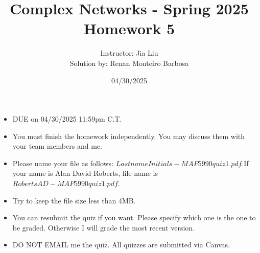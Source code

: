 \documentclass{amsart}
\theoremstyle{definition}
\theoremstyle{remark}
\numberwithin{equation}{section}
\begin{document}
\title{Complex Networks  - Spring 2025\\{\bf Homework 5}}%
\author{Instructor: Jia Liu \\ Solution by: Renan Monteiro Barbosa}%
\date{04/30/2025}


\maketitle
\begin{itemize}
\item DUE on  04/30/2025 11:59pm C.T.
\item You must finish the homework independently. You may discuss them with your team members and me. 
\item Please name your file as follows: $LastnameInitials-MAP5990quiz1.pdf$.If your name is Alan David Roberts, file name is $RobertsAD-MAP5990quiz1.pdf$.
\item Try to keep the file size less than 4MB.
\item You can resubmit the quiz if you want. Please specify which one is the one to be graded. Otherwise I will grade the most recent version.
\item DO NOT EMAIL me the quiz. All quizzes are submitted via Canvas.
\end{itemize}
\end{document}
